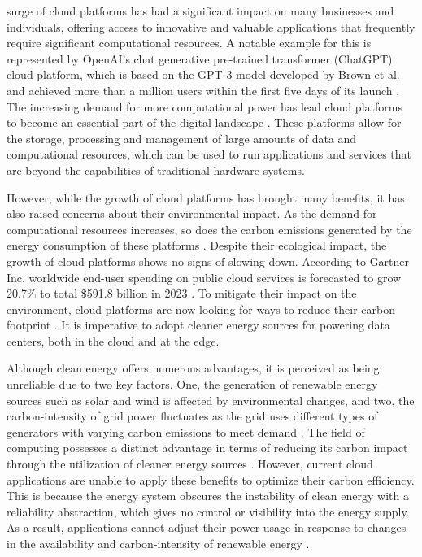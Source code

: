  surge of cloud platforms has had a significant impact on
many businesses and individuals, offering access to innovative and valuable
applications that frequently require significant computational resources. A
notable example for this is represented by OpenAI's chat generative pre-trained
transformer (ChatGPT) cloud platform, which is based on the GPT-3 model
developed by Brown et al. \cite{brown2020} and achieved more than a million
users within the first five days of its launch \cite{brockman2022}. The
increasing demand for more computational power has lead cloud platforms to
become an essential part of the digital landscape \cite{zhang2010}. These
platforms allow for the storage, processing and management of large amounts of
data and computational resources, which can be used to run applications and
services that are beyond the capabilities of traditional hardware systems.

However, while the growth of cloud platforms has brought many benefits, it has
also raised concerns about their environmental impact. As the demand for
computational resources increases, so does the carbon emissions generated by the
energy consumption of these platforms \cite{siddik2021}. Despite their
ecological impact, the growth of cloud platforms shows no signs of slowing down.
According to Gartner Inc. worldwide end-user spending on public cloud services
is forecasted to grow 20.7\% to total \$591.8 billion in 2023
\cite{gartner2022}. To mitigate their impact on the environment, cloud platforms
are now looking for ways to reduce their carbon footprint \cite{google_carbon,
amazon_carbon}. It is imperative to adopt cleaner energy sources for powering
data centers, both in the cloud and at the edge. \medskip

Although clean energy offers numerous advantages, it is perceived as being
unreliable due to two key factors. One, the generation of renewable energy
sources such as solar and wind is affected by environmental changes, and two,
the carbon-intensity of grid power fluctuates as the grid uses different types
of generators with varying carbon emissions to meet demand \cite{scarlat2022}.
The field of computing possesses a distinct advantage in terms of reducing its
carbon impact through the utilization of cleaner energy sources
\cite{murugesan2008}. However, current cloud applications are unable to apply
these benefits to optimize their carbon efficiency. This is because the energy
system obscures the instability of clean energy with a reliability abstraction,
which gives no control or visibility into the energy supply. As a result,
applications cannot adjust their power usage in response to changes in the
availability and carbon-intensity of renewable energy \cite{souza2023}.


